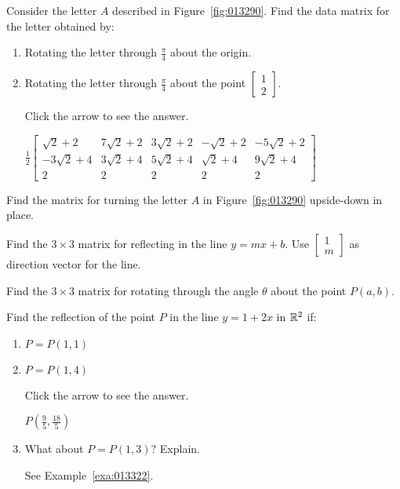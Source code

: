 \documentclass{ximera}
\begin{document}
\begin{problem}
Consider the letter $A$ described in Figure~\ref{fig:013290}. Find the data matrix for the letter obtained by:


\begin{enumerate} 
\item Rotating the letter through $\frac{\pi}{4}$ about the origin.

\item Rotating the letter through $\frac{\pi}{4}$
 about the point $\left[
 \begin{array}{c}
 1\\
 2
 \end{array}
 \right]$.

Click the arrow to see the answer.
\begin{expandable}
${\frac{1}{2}\left[
\begin{array}{ccccc}
\sqrt{2} + 2 & 7\sqrt{2} + 2 & 3\sqrt{2} + 2 & -\sqrt{2} + 2 & -5\sqrt{2} + 2\\
-3\sqrt{2} + 4 & 3\sqrt{2} + 4 & 5\sqrt{2} + 4 & \sqrt{2} + 4 & 9\sqrt{2} + 4 \\
2 & 2 & 2 & 2 & 2
\end{array}
\right]}$
\end{expandable}
\end{enumerate}
\end{problem}

\begin{problem}
Find the matrix for turning the letter $A$ in Figure~\ref{fig:013290} upside-down in place.
\end{problem}

\begin{problem}
Find the $3 \times 3$ matrix for reflecting in the line $y = mx + b$. Use $\left[
\begin{array}{c}
1\\
m
\end{array}
\right]$ as direction vector for the line.
\end{problem}

\begin{problem}
Find the $3 \times 3$ matrix for rotating through the angle $\theta$ about the point $P(a, b)$.
\end{problem}

\begin{problem}
Find the reflection of the point $P$ in the line $y = 1 + 2x$ in $\mathbb{R}^2$ if:


\begin{enumerate} 
\item $P = P(1, 1)$

\item $P = P(1, 4)$

Click the arrow to see the answer.
\begin{expandable}
$P(\frac{9}{5}, \frac{18}{5})$
\end{expandable}

\item What about $P = P(1, 3)$? Explain.
\begin{hint}
    See Example~\ref{exa:013322}.
\end{hint}
\end{enumerate}
\end{problem}
\end{document}
